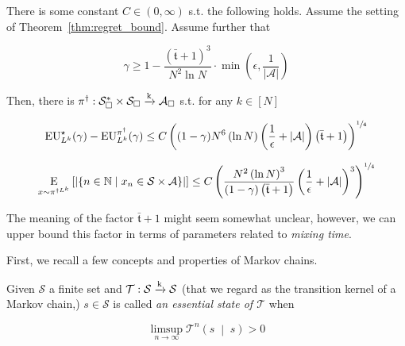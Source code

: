 \documentclass[anon,12pt]{colt2018} %
\newcommand{\AP}[1]{\left(#1\right)}
\newcommand{\AB}[1]{\left[#1\right]}
\newcommand{\APM}[2]{\left(#1\;\middle\vert\;#2\right)}
\newcommand{\ACM}[2]{\left\{#1\;\middle\vert\;#2\right\}}
\newcommand{\Ea}[2]{\underset{#1}{\operatorname{E}}\AB{#2}}
\newcommand{\Nats}{\mathbb{N}}
\newcommand{\Abs}[1]{\left\vert #1 \right\vert}
\newcommand{\K}{\xrightarrow{\textnormal{k}}}
\newcommand{\A}{\mathcal{A}}
\newcommand{\St}{\mathcal{S}}
\newcommand{\T}{\mathcal{T}}
\newcommand{\EU}{\operatorname{EU}}
\newcommand{\Tn}{\mathfrak{t}}
\begin{document}
\begin{samepage}
\begin{corollary}
\label{crl:balanced_regret_bound}

There is some constant $C \in (0,\infty)$ s.t. the following holds. Assume the setting of Theorem~\ref{thm:regret_bound}. Assume further that 

\begin{equation}
\gamma \geq 1 - \frac{\AP{\bar{\Tn}+1}^3}{N^2 \ln{N}}\cdot\min\AP{\epsilon,\frac{1}{\Abs{\A}}}
\end{equation}

Then, there is $\pi^\dagger: \St_\square^* \times \St_\square \K \A_\square$ s.t. for any $k\in[N]$

\begin{equation}
\label{eqn:crl__balanced_regret_bound__regret}
\EU_{L^k}^\star(\gamma) - \EU_{L^k}^{\pi^\dagger}(\gamma) \leq C\AP{(1-\gamma)N^6 \AP{\ln N} \AP{\frac{1}{\epsilon}+\Abs{\A}}\AP{\bar{\Tn}+1}}^{\sfrac{1}{4}}
\end{equation}

\begin{equation}
\label{eqn:crl__balanced_regret_bound__delegations}
\Ea{x\sim\pi^{\dagger L^k}}{\Abs{\ACM{n\in\Nats}{x_n\in\St\times\A}}} \leq C\AP{\frac{N^2\AP{\ln{N}}^3}{(1-\gamma)\AP{\bar{\Tn}+1}}\AP{\frac{1}{\epsilon}+\Abs{\A}}^3}^{\sfrac{1}{4}}
\end{equation}

\end{corollary}
\end{samepage}

The meaning of the factor $\bar{\Tn}+1$ might seem somewhat unclear, however, we can upper bound this factor in terms of parameters related to \emph{mixing time}. 

First, we recall a few concepts and properties of Markov chains.

\begin{samepage}
\begin{definition}

Given $\St$ a finite set and $\T: \St \K \St$ (that we regard as the transition kernel of a Markov chain,) $s \in \St$ is called \emph{an essential state of $\T$} when

\begin{equation}
\limsup_{n \rightarrow \infty} {\T^n\APM{s}{s}} > 0
\end{equation}

\end{definition}
\end{samepage}
\end{document}
